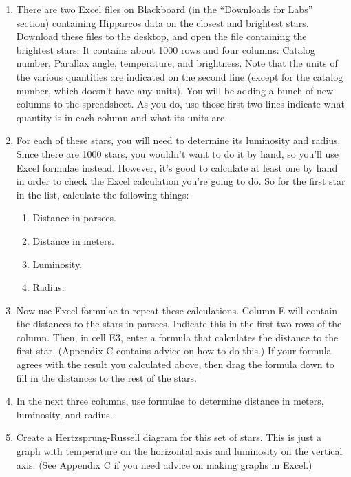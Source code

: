 \begin{enumerate}

\item There are two Excel files on Blackboard (in the ``Downloads for Labs'' 
section) containing Hipparcos data
on the closest and brightest stars.  Download these files to the desktop,
and open the file containing the brightest stars.  It contains
about 1000 rows and four columns: Catalog number, Parallax angle, 
temperature, and brightness.  Note that the units of the various
quantities are indicated on the second line (except for the catalog
number, which doesn't have any units). 
You will be adding a bunch of new columns to the spreadsheet.  As you
do, use those first two lines indicate what quantity is in each column
and what its units are.

\item For each of these stars, you will need to determine its luminosity
and radius.  Since there are 1000 stars, you wouldn't want to do it by
hand, so you'll use Excel formulae instead.  However, it's good to 
calculate at least one by hand in order to check the Excel calculation
you're going to do.  So for the first star in the list, calculate
the following things:
\begin{enumerate}
\item Distance in parsecs.
\item Distance in meters.
\item Luminosity.
\item Radius.
\end{enumerate}

\answerspace{3in}

\item Now use Excel formulae to repeat these calculations.
Column E will contain the distances to the stars in parsecs.  Indicate
this in the first two rows of the column.  Then, in cell E3, enter
a formula that calculates the distance to the first star.  
(Appendix C contains advice on how to do this.)  If your
formula agrees with the result you calculated above, then drag
the formula down to fill in the distances to the rest of the stars.

\item In the next three columns, use formulae to determine distance
in meters, luminosity, and radius.  

\item Create a Hertzsprung-Russell diagram for this set of stars.
This is just a graph with temperature on the horizontal axis and
luminosity on the vertical axis.  (See Appendix C if you need
advice on making graphs in Excel.)  


\end{enumerate}
